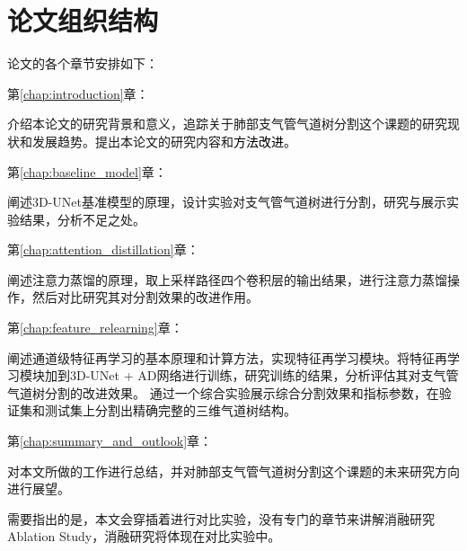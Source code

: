 \section{论文组织结构}

论文的各个章节安排如下：

{\kaishu 第\ref{chap:introduction}章：}

介绍本论文的研究背景和意义，追踪关于肺部支气管气道树分割这个课题的研究现状和发展趋势。提出本论文的研究内容和\textcolor{black}{方法改进}。

{\kaishu 第\ref{chap:baseline_model}章：}

阐述3D-UNet基准模型的原理，设计实验对支气管气道树进行分割，研究与展示实验结果，分析不足之处。

{\kaishu 第\ref{chap:attention_distillation}章：}

阐述注意力蒸馏的原理，取上采样路径四个卷积层的输出结果，进行注意力蒸馏操作，然后对比研究其对分割效果的改进作用。

{\kaishu 第\ref{chap:feature_relearning}章：}

阐述通道级特征再学习的基本原理和计算方法，实现特征再学习模块。将特征再学习模块加到3D-UNet + AD网络进行训练，研究训练的结果，分析评估其对支气管气道树分割的改进效果。
通过一个综合实验展示综合分割效果和指标参数，在验证集和测试集上分割出精确完整的三维气道树结构。

{\kaishu 第\ref{chap:summary_and_outlook}章：}

对本文所做的工作进行总结，并对肺部支气管气道树分割这个课题的未来研究方向进行展望。

需要指出的是，本文会穿插着进行对比实验，没有专门的章节来讲解消融研究Ablation Study，消融研究将体现在对比实验中。




